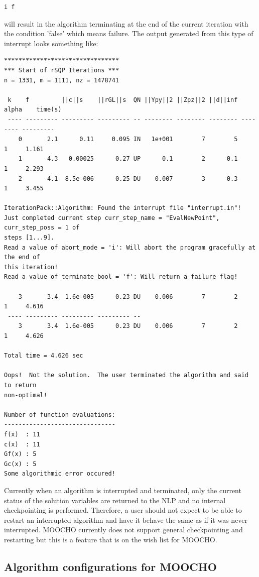 \documentclass[pdf,ps2pdf,11pt]{SANDreport}
\begin{document}
\begin{verbatim}
i f
\end{verbatim}

will result in the algorithm terminating at the end of the current iteration
with the condition 'false' which means failure.  The output generated from
this type of interrupt looks something like:
%
{\small\begin{verbatim}
********************************
*** Start of rSQP Iterations ***
n = 1331, m = 1111, nz = 1478741

 k    f         ||c||s    ||rGL||s  QN ||Ypy||2 ||Zpz||2 ||d||inf alpha    time(s)
 ---- --------- --------- --------- -- -------- -------- -------- -------- ---------
    0       2.1      0.11     0.095 IN   1e+001        7        5        1     1.161
    1       4.3   0.00025      0.27 UP      0.1        2      0.1        1     2.293
    2       4.1  8.5e-006      0.25 DU    0.007        3      0.3        1     3.455

IterationPack::Algorithm: Found the interrupt file "interrupt.in"!
Just completed current step curr_step_name = "EvalNewPoint",  curr_step_poss = 1 of
steps [1...9].
Read a value of abort_mode = 'i': Will abort the program gracefully at the end of
this iteration!
Read a value of terminate_bool = 'f': Will return a failure flag!

    3       3.4  1.6e-005      0.23 DU    0.006        7        2        1     4.616
 ---- --------- --------- --------- --
    3       3.4  1.6e-005      0.23 DU    0.006        7        2        1     4.626

Total time = 4.626 sec

Oops!  Not the solution.  The user terminated the algorithm and said to return
non-optimal!

Number of function evaluations:
-------------------------------
f(x)  : 11
c(x)  : 11
Gf(x) : 5
Gc(x) : 5
Some algorithmic error occured!
\end{verbatim}}

Currently when an algorithm is interrupted and terminated, only the current
status of the solution variables are returned to the NLP and no internal
checkpointing is performed.  Therefore, a user should not expect to be able to
restart an interrupted algorithm and have it behave the same as if it was
never interrupted.  MOOCHO currently does not support general checkpointing
and restarting but this is a feature that is on the wish list for MOOCHO.

%
\subsection{Algorithm configurations for MOOCHO}
%
\end{document}
